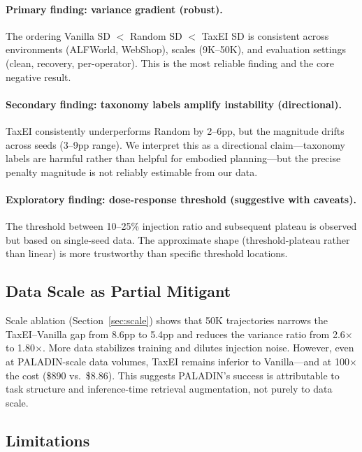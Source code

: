 \documentclass[11pt,a4paper]{article}
\begin{document}
\paragraph{Primary finding: variance gradient (robust).} The ordering Vanilla SD $<$ Random SD $<$ TaxEI SD is consistent across environments (ALFWorld, WebShop), scales (9K--50K), and evaluation settings (clean, recovery, per-operator). This is the most reliable finding and the core negative result.

\paragraph{Secondary finding: taxonomy labels amplify instability (directional).} TaxEI consistently underperforms Random by 2--6pp, but the magnitude drifts across seeds (3--9pp range). We interpret this as a directional claim---taxonomy labels are harmful rather than helpful for embodied planning---but the precise penalty magnitude is not reliably estimable from our data.

\paragraph{Exploratory finding: dose-response threshold (suggestive with caveats).} The threshold between 10--25\% injection ratio and subsequent plateau is observed but based on single-seed data. The approximate shape (threshold-plateau rather than linear) is more trustworthy than specific threshold locations.

\subsection{Data Scale as Partial Mitigant}

Scale ablation (Section~\ref{sec:scale}) shows that 50K trajectories narrows the TaxEI--Vanilla gap from 8.6pp to 5.4pp and reduces the variance ratio from 2.6$\times$ to 1.80$\times$. More data stabilizes training and dilutes injection noise. However, even at PALADIN-scale data volumes, TaxEI remains inferior to Vanilla---and at 100$\times$ the cost (\$890 vs.\ \$8.86). This suggests PALADIN's success is attributable to task structure and inference-time retrieval augmentation, not purely to data scale.

\subsection{Limitations}
\end{document}
